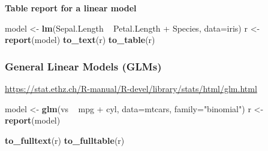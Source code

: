 \documentclass[
]{article}
\newenvironment{Shaded}{\begin{snugshade}}{\end{snugshade}}
\newcommand{\DataTypeTok}[1]{\textcolor[rgb]{0.00,0.34,0.68}{#1}}
\newcommand{\KeywordTok}[1]{\textcolor[rgb]{0.12,0.11,0.11}{\textbf{#1}}}
\newcommand{\NormalTok}[1]{\textcolor[rgb]{0.12,0.11,0.11}{#1}}
\newcommand{\OperatorTok}[1]{\textcolor[rgb]{0.12,0.11,0.11}{#1}}
\newcommand{\StringTok}[1]{\textcolor[rgb]{0.75,0.01,0.01}{#1}}
\begin{document}
\textbf{Table report for a linear model}

\begin{Shaded}
\begin{Highlighting}[]
\NormalTok{model <-}\StringTok{ }\KeywordTok{lm}\NormalTok{(Sepal.Length }\OperatorTok{~}\StringTok{ }\NormalTok{Petal.Length }\OperatorTok{+}\StringTok{ }\NormalTok{Species, }\DataTypeTok{data=}\NormalTok{iris)}
\NormalTok{r <-}\StringTok{ }\KeywordTok{report}\NormalTok{(model)}
\KeywordTok{to_text}\NormalTok{(r)}
\KeywordTok{to_table}\NormalTok{(r)}
\end{Highlighting}
\end{Shaded}

\hypertarget{general-linear-models-glms}{%
\subsubsection{General Linear Models
(GLMs)}\label{general-linear-models-glms}}

\url{https://stat.ethz.ch/R-manual/R-devel/library/stats/html/glm.html}

\begin{Shaded}
\begin{Highlighting}[]
\NormalTok{model <-}\StringTok{ }\KeywordTok{glm}\NormalTok{(vs }\OperatorTok{~}\StringTok{ }\NormalTok{mpg }\OperatorTok{+}\StringTok{ }\NormalTok{cyl, }\DataTypeTok{data=}\NormalTok{mtcars, }\DataTypeTok{family=}\StringTok{"binomial"}\NormalTok{)}
\NormalTok{r <-}\StringTok{ }\KeywordTok{report}\NormalTok{(model)}

\KeywordTok{to_fulltext}\NormalTok{(r)}
\KeywordTok{to_fulltable}\NormalTok{(r)}
\end{Highlighting}
\end{Shaded}
\end{document}
